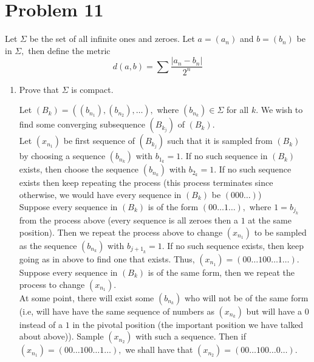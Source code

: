 \documentclass[11pt]{article}
\begin{document}
\section*{Problem 11}
\begin{problem}
    Let $\Sigma$ be the set of all infinite ones and zeroes. Let $a = (a_n)$ and $b= (b_n)$ be in $\Sigma,$ then define the metric
    \[d(a,b) = \sum\frac{|a_n-b_n|}{2^n}\]
\end{problem}
\begin{enumerate}
    \item 
    \begin{problem}
        Prove that $\Sigma$ is compact. 
    \end{problem}
    \begin{solution}
        Let $(B_k) = ((b_{n_1}), (b_{n_2}), \dots),$ where $(b_{n_k})\in \Sigma$ for all $k.$ We wish to find some converging subsequence $(B_{k_j})$ of $(B_k).$\\
        
        Let $(x_{n_1})$ be first sequence of $(B_{k_j})$ such that it is sampled from $(B_k)$ by choosing a sequence $(b_{n_k})$ with $b_{1_k} = 1.$ If no such sequence in $(B_k)$ exists, then choose the sequence $(b_{n_k})$ with $b_{2_k} = 1.$ If no such sequence exists then keep repeating the process (this process terminates since otherwise, we would have every sequence in $(B_k)$ be $(000\dots)$)\\

        Suppose every sequence in $(B_k)$ is of the form $(00\dots1\dots),$ where $1 = b_{j_k}$ from the process above (every sequence is all zeroes then a $1$ at the same position). Then we repeat the process above to change $(x_{n_1})$ to be sampled as the sequence $(b_{n_k})$ with $b_{{j+1}_k} = 1.$ If no such sequence exists, then keep going as in above to find one that exists. Thus, $(x_{n_1}) = (00\dots 100\dots1\dots).$ Suppose every sequence in $(B_k)$ is of the same form, then we repeat the process to change $(x_{n_1}).$\\

        At some point, there will exist some $(b_{n_k})$ who will not be of the same form (i.e, will have have the same sequence of numbers as $(x_{n_k})$ but will have a $0$ instead of a $1$ in the pivotal position (the important position we have talked about above)). Sample $(x_{n_2})$ with such a sequence. Then if $(x_{n_1}) = (00\dots 100\dots 1\dots),$ we shall have that $(x_{n_2}) = (00\dots 100\dots 0\dots).$\\ 
        

\end{solution}
\end{enumerate}
\end{document}
